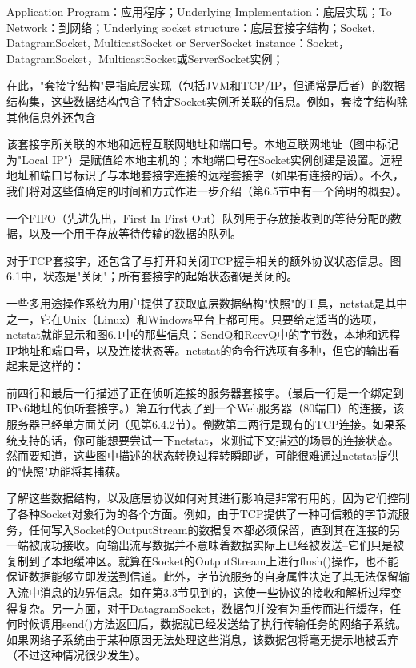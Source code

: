 	Application Program：应用程序；Underlying Implementation：底层实现；To Network：到网络；Underlying socket structure：底层套接字结构；Socket, DatagramSocket, MulticastSocket or ServerSocket instance：Socket，DatagramSocket，MulticastSocket或ServerSocket实例；

	在此，"套接字结构"是指底层实现（包括JVM和TCP/IP，但通常是后者）的数据结构集，这些数据结构包含了特定Socket实例所关联的信息。例如，套接字结构除其他信息外还包含

	该套接字所关联的本地和远程互联网地址和端口号。本地互联网地址（图中标记为"Local IP"）是赋值给本地主机的；本地端口号在Socket实例创建是设置。远程地址和端口号标识了与本地套接字连接的远程套接字（如果有连接的话）。不久，我们将对这些值确定的时间和方式作进一步介绍（第6.5节中有一个简明的概要）。

	一个FIFO（先进先出，First In First Out）队列用于存放接收到的等待分配的数据，以及一个用于存放等待传输的数据的队列。

	对于TCP套接字，还包含了与打开和关闭TCP握手相关的额外协议状态信息。图6.1中，状态是"关闭"；所有套接字的起始状态都是关闭的。

	一些多用途操作系统为用户提供了获取底层数据结构"快照"的工具，netstat是其中之一，它在Unix（Linux）和Windows平台上都可用。只要给定适当的选项，netstat就能显示和图6.1中的那些信息：SendQ和RecvQ中的字节数，本地和远程IP地址和端口号，以及连接状态等。netstat的命令行选项有多种，但它的输出看起来是这样的：

	

	前四行和最后一行描述了正在侦听连接的服务器套接字。（最后一行是一个绑定到IPv6地址的侦听套接字。）第五行代表了到一个Web服务器（80端口）的连接，该服务器已经单方面关闭（见第6.4.2节）。倒数第二两行是现有的TCP连接。如果系统支持的话，你可能想要尝试一下netstat，来测试下文描述的场景的连接状态。然而要知道，这些图中描述的状态转换过程转瞬即逝，可能很难通过netstat提供的"快照"功能将其捕获。

	了解这些数据结构，以及底层协议如何对其进行影响是非常有用的，因为它们控制了各种Socket对象行为的各个方面。例如，由于TCP提供了一种可信赖的字节流服务，任何写入Socket的OutputStream的数据复本都必须保留，直到其在连接的另一端被成功接收。向输出流写数据并不意味着数据实际上已经被发送--它们只是被复制到了本地缓冲区。就算在Socket的OutputStream上进行flush()操作，也不能保证数据能够立即发送到信道。此外，字节流服务的自身属性决定了其无法保留输入流中消息的边界信息。如在第3.3节见到的，这使一些协议的接收和解析过程变得复杂。另一方面，对于DatagramSocket，数据包并没有为重传而进行缓存，任何时候调用send()方法返回后，数据就已经发送给了执行传输任务的网络子系统。如果网络子系统由于某种原因无法处理这些消息，该数据包将毫无提示地被丢弃（不过这种情况很少发生）。

